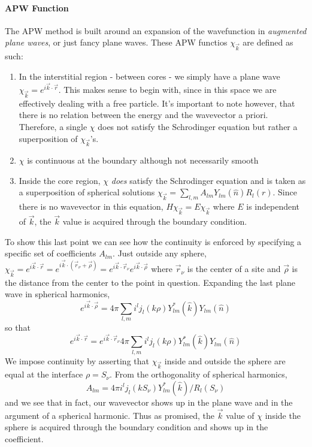 \documentclass[11pt]{article}
\numberwithin{equation}{section}
\begin{document}
\paragraph{APW Function}
The APW method is built around an expansion of the wavefunction in \textit{augmented plane waves}, or just fancy plane waves. These APW functios $\chi_{\vec{k}}$ are defined as such:
\begin{enumerate}
\item In the interstitial region - between cores - we simply have a plane wave $\chi_{\vec{k}} = e^{i\vec{k}\cdot\vec{r}}$. This makes sense to begin with, since in this space we are effectively dealing with a free particle. It's important to note however, that there is no relation between the energy and the wavevector a priori. Therefore, a single $\chi$ does not satisfy the Schrodinger equation but rather a superposition of $\chi_{\vec{k}}$'s.

\item $\chi$ is continuous at the boundary although not necessarily smooth

\item Inside the core region, $\chi$ \textit{does} satisfy the Schrodinger equation and is taken as a superposition of spherical solutions $\chi_{\vec{k}} = \sum_{l,m}A_{lm}Y_{lm}(\hat{n})R_l(r)$. Since there is no wavevector in this equation, $H\chi_{\vec{k}} = E\chi_{\vec{k}}$ where $E$ is independent of $\vec{k}$, the $\vec{k}$ value is acquired through the boundary condition.
\end{enumerate}

To show this last point we can see how the continuity is enforced by specifying a specific set of coefficients $A_{lm}$. Just outside any sphere, $\chi_{\vec{k}} = e^{i\vec{k}\cdot\vec{r}} = e^{i\vec{k}\cdot(\vec{r}_{\nu} + \vec{\rho})} = e^{i\vec{k}\cdot\vec{r}_{\nu}}e^{i\vec{k}\cdot\vec{\rho}}$ where $\vec{r}_{\nu}$ is the center of a site and $\vec{\rho}$ is the distance from the center to the point in question. Expanding the last plane wave in spherical harmonics,
\begin{equation}
e^{i\vec{k}\cdot\vec{\rho}} = 4\pi\sum_{l,m}i^l j_l(k\rho)Y^*_{lm}(\hat{k})Y_{lm}(\hat{n})
\end{equation}
so that
\begin{equation}
e^{i\vec{k}\cdot\vec{r}} = e^{i\vec{k}\cdot\vec{r}_{\nu}}4\pi\sum_{l,m}i^l j_l(k\rho)Y^*_{lm}(\hat{k})Y_{lm}(\hat{n})
\end{equation}
We impose continuity by asserting that $\chi_{\vec{k}}$ inside and outside the sphere are equal at the interface $\rho = S_{\nu}$. From the orthogonality of spherical harmonics,
\begin{equation}
A_{lm} = 4\pi i^l j_l(kS_{\nu})Y^*_{lm}(\hat{k})/R_l(S_{\nu})
\end{equation}
and we see that in fact, our wavevector shows up in the plane wave and in the argument of a spherical harmonic. Thus as promised, the $\vec{k}$ value of $\chi$ inside the sphere is acquired through the boundary condition and shows up in the coefficient.
\end{document}
